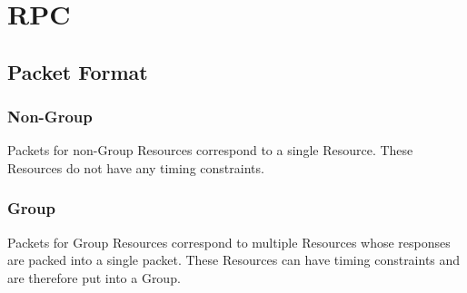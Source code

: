 \documentclass{article}
\begin{document}
\section{RPC}

\subsection{Packet Format}

\subsubsection{Non-Group}

Packets for non-Group Resources correspond to a single Resource. These Resources do not have any
timing constraints.

\subsubsection{Group}

Packets for Group Resources correspond to multiple Resources whose responses are packed into a
single packet. These Resources can have timing constraints and are therefore put into a Group.
\end{document}
